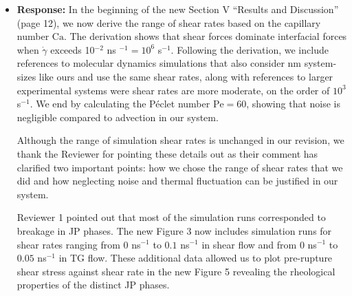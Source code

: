 \documentclass[11pt]{article}
\begin{document}
\begin{itemize}
\item {\bf Response:}
  In the beginning  of the new Section V ``Results and Discussion'' (page 12),
  we now derive the range of shear rates 
  based on the capillary number $\mathrm{Ca}$.  The derivation shows that shear forces dominate
  interfacial forces when $\dot \gamma$ exceeds
  10$^{-2}$ ns $^{-1} = 10^6$ s$^{-1}$.  Following the derivation,
  we include references to molecular dynamics simulations that also
  consider nm system-sizes like ours and use the same shear rates,
  along with references to
  larger experimental systems were shear rates are more moderate,
  on the order of $10^3$ s$^{-1}$.  We end by calculating the
  P\'eclet number $\mathrm{Pe} = 60$, showing that
  noise is negligible compared to advection in our system.  

  Although the range of simulation shear rates is unchanged in our
  revision, we thank the Reviewer for pointing these details out
  as their comment has clarified
  two important points: how we chose the range of shear
  rates that we did and how neglecting noise and
  thermal fluctuation can be justified in our system.

  Reviewer 1 pointed out that most of the simulation runs
  corresponded to breakage in JP phases. The new Figure 3
  now includes simulation runs for shear rates ranging
  from $0$ ns$^{-1}$ to $0.1$ ns$^{-1}$ in shear flow
  and from $0$ ns$^{-1}$ to $0.05$ ns$^{-1}$ in TG flow.
  These additional data allowed us to plot pre-rupture
  shear stress against shear rate in the new Figure 5
  revealing the rheological properties of the distinct
  JP phases. 
\end{itemize}
\end{document}
